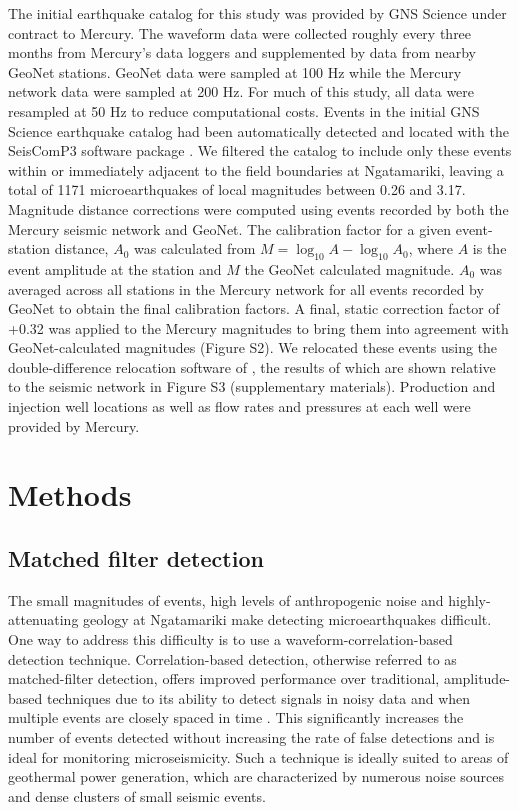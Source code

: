 The initial earthquake catalog for this study was provided by GNS Science under contract to Mercury. The waveform data were collected roughly every three months from Mercury's data loggers and supplemented by data from nearby GeoNet stations. GeoNet data were sampled at 100 Hz while the Mercury network data were sampled at 200 Hz. For much of this study, all data were resampled at 50 Hz to reduce computational costs. Events in the initial GNS Science earthquake catalog had been automatically detected and located with the SeisComP3 software package \citep{Weber2007}. We filtered the catalog to include only these events within or immediately adjacent to the field boundaries at Ngatamariki, leaving a total of 1171 microearthquakes of local magnitudes between 0.26 and 3.17. Magnitude distance corrections were computed using events recorded by both the Mercury seismic network and GeoNet. The calibration factor for a given event-station distance, $A_0$ was calculated from $M = \log_{10}A - \log_{10}A_{0}$, where $A$ is the event amplitude at the station and $M$ the GeoNet calculated magnitude. $A_{0}$ was averaged across all stations in the Mercury network for all events recorded by GeoNet to obtain the final calibration factors. A final, static correction factor of +0.32 was applied to the Mercury magnitudes to bring them into agreement with GeoNet-calculated magnitudes (Figure S2). We relocated these events using the double-difference relocation software of \citet{Waldhauser_2000}, the results of which are shown relative to the seismic network in Figure S3 (supplementary materials). Production and injection well locations as well as flow rates and pressures at each well were provided by Mercury.

\section{Methods}
\subsection{Matched filter detection}

The small magnitudes of events, high levels of anthropogenic noise and highly-attenuating geology  at Ngatamariki make detecting microearthquakes difficult. One way to address this difficulty is to use a waveform-correlation-based detection technique. Correlation-based detection, otherwise referred to as matched-filter detection, offers improved performance over traditional, amplitude-based techniques due to its ability to detect signals in noisy data and when multiple events are closely spaced in time \citep{Gibbons_2006, Shelly_2007}. This significantly increases the number of events detected without increasing the rate of false detections and is ideal for monitoring microseismicity. Such a technique is ideally suited to areas of geothermal power generation, which are characterized by numerous noise sources and dense clusters of small seismic events.

